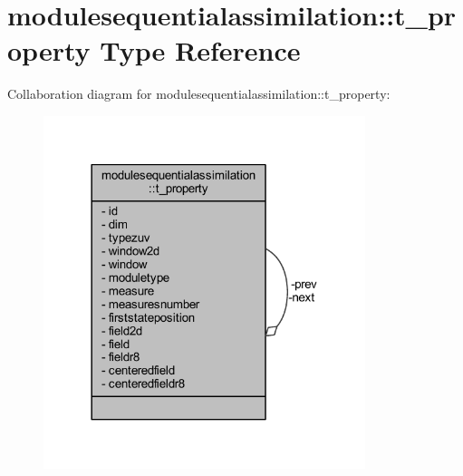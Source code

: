 \hypertarget{structmodulesequentialassimilation_1_1t__property}{}\section{modulesequentialassimilation\+:\+:t\+\_\+property Type Reference}
\label{structmodulesequentialassimilation_1_1t__property}


Collaboration diagram for modulesequentialassimilation\+:\+:t\+\_\+property\+:\nopagebreak
\begin{figure}[H]
\begin{center}
\leavevmode
\includegraphics[width=266pt]{structmodulesequentialassimilation_1_1t__property__coll__graph}
\end{center}
\end{figure}

